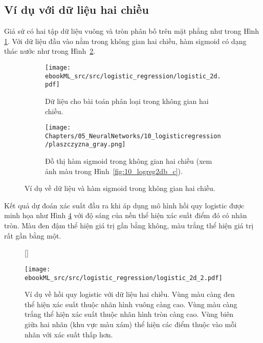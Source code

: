 \subsection{Ví dụ với dữ liệu hai chiều}
Giả sử có hai tập dữ liệu vuông và tròn phân bố trên mặt phẳng như trong Hình \ref{fig:10_logreg2da}. Với dữ liệu đầu vào nằm trong không gian hai chiều, hàm sigmoid có dạng thác nước như trong Hình~\ref{fig:10_logreg2db}.

\begin{figure}[t]
    \begin{subfigure}{0.49\textwidth}
    \texttt{[image: ebookML\_src/src/logistic\_regression/logistic\_2d.pdf]}
    \caption{Dữ liệu cho bài toán phân loại trong không gian hai chiều.}
    \label{fig:10_logreg2da}
    \end{subfigure}
    \begin{subfigure}{0.45\textwidth}
    \texttt{[image: Chapters/05\_NeuralNetworks/10\_logisticregression/plaszczyzna\_gray.png]}
    \caption{Đồ thị hàm sigmoid trong không gian hai chiều (xem ảnh màu trong Hình~\ref{fig:10_logreg2db_c}).}
    \label{fig:10_logreg2db}
    \end{subfigure}
    \caption{
        Ví dụ về dữ liệu và hàm sigmoid trong không gian hai chiều.
    }
    \label{fig:10_logreg2d}
\end{figure}



Kết quả dự đoán xác suất đầu ra khi áp dụng mô hình hồi quy logistic được minh họa như Hình
\ref{fig:10_7} với độ sáng của nền thể hiện xác suất điểm đó có nhãn tròn. Màu đen
đậm thể hiện giá trị gần bằng không, màu trắng thể hiện giá trị rất gần bằng một.

\begin{figure}[t]
    [\FBwidth]
    {\caption{ 
    Ví dụ về hồi quy logistic với dữ liệu hai chiều. Vùng màu càng đen thể hiện xác suất thuộc nhãn hình vuông càng cao. Vùng màu càng trắng thể hiện xác suất thuộc nhãn hình tròn càng cao. Vùng biên giữa hai nhãn (khu vực màu xám) thể hiện các điểm thuộc vào mỗi nhãn với xác suất thấp hơn.    }
    \label{fig:10_7}}
    { %
    \texttt{[image: ebookML\_src/src/logistic\_regression/logistic\_2d\_2.pdf]}
    }
\end{figure}

